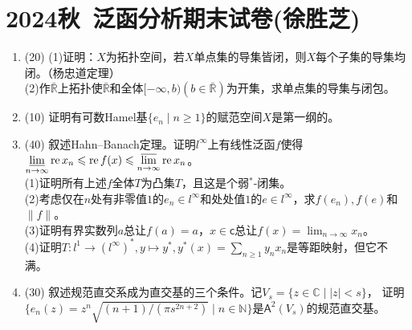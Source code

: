 \section{2024秋\ 泛函分析期末试卷(徐胜芝)}
\begin{enumerate}[label=T\arabic*]
\item (20) 
(1)证明：$X$为拓扑空间，若$X$单点集的导集皆闭，则$X$每个子集的导集均闭。（杨忠道定理）\\
(2)作$\bar{\mathbb{R}}$上拓扑使$\bar{\mathbb{R}}$和全体$[-\infty,b)(b\in\bar{\mathbb{R}})$为开集，求单点集的导集与闭包。

\item (10) 证明有可数Hamel基$\{e_n\mid n\geqslant 1\}$的赋范空间$X$是第一纲的。

\item (40) 叙述Hahn--Banach定理。证明$l^{\infty}$上有线性泛函$f$使得$\displaystyle \varliminf_{n \to \infty} \operatorname{re} x_n \leqslant \operatorname{re} f(x) \leqslant \varlimsup_{n \to \infty} \operatorname{re} x_n$。\\
(1)证明所有上述$f$全体$T$为凸集$T$，且这是个弱$^*$-闭集。\\
(2)考虑仅在$n$处有非零值$1$的$e_n\in l^\infty$和处处值$1$的$e\in l^\infty$，求$f(e_n),f(e)$和$\|f\|$。\\
(3)证明有界实数列$a$总让$f(a)=a$，$x\in\mathsf{c}$总让$f(x)=\lim_{n\to\infty}x_n$。\\
(4)证明$T: l^1\to (l^\infty)^*,y\mapsto y^*,  y^*(x)=\sum_{n\geqslant 1}y_nx_n$是等距映射，但它不满。

\item (30) 叙述规范直交系成为直交基的三个条件。记$V_s=\{z\in\mathbb{C}\mid|z|<s\}$，
证明$\{e_n(z)=z^n\sqrt{(n+1)/(\pi s^{2n+2})} \mid n \in \mathbb{N}\}$是$\mathsf{A}^2(V_s)$的规范直交基。
\end{enumerate}

